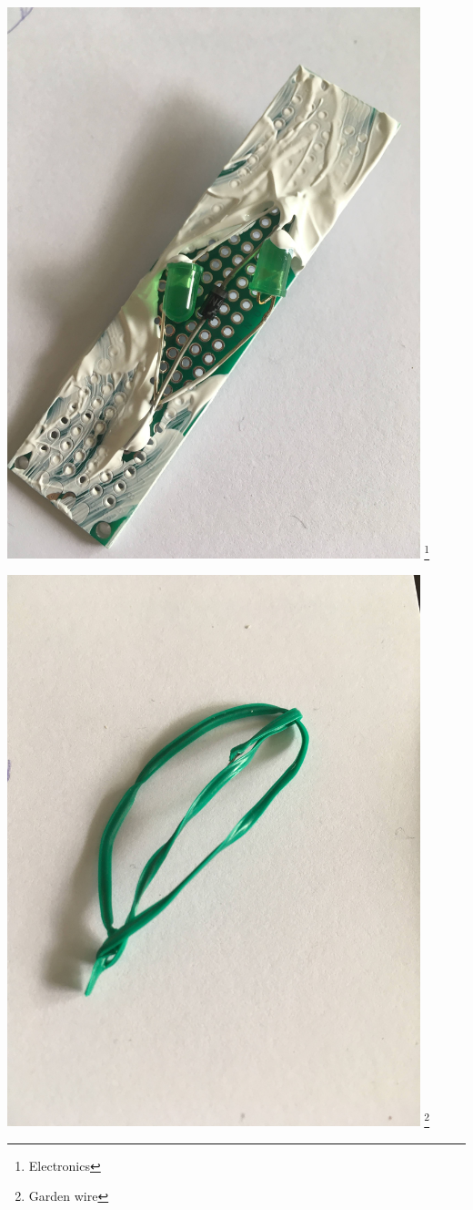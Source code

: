 \documentclass[12pt, a4paper]{article}
\begin{document}
\includegraphics[width=0.9\textwidth,height=\textheight,keepaspectratio]{leaf-electronics.jpg}
\footnote{Electronics}
\newpage

\includegraphics[width=0.9\textwidth,height=\textheight,keepaspectratio]{leaf-gardenwire.jpg}
\footnote{Garden wire}
\newpage
\end{document}
